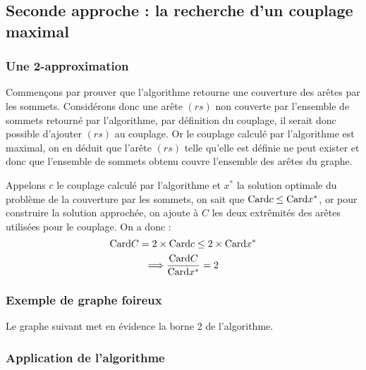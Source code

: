 \subsection{Seconde approche : la recherche d'un couplage maximal}

\subsubsection{Une 2-approximation}

Commençons par prouver que l'algorithme retourne une couverture des arêtes par les sommets.
Considérons donc une arête $(rs)$ non couverte par l'ensemble de sommets retourné par l'algorithme, par
définition du couplage, il serait donc possible d'ajouter $(rs)$ au couplage. Or le couplage calculé
par l'algorithme est maximal, on en déduit que l'arête $(rs)$ telle qu'elle est définie ne peut
exister et donc que l'ensemble de sommets obtenu couvre l'ensemble des arêtes du graphe.

Appelons $c$ le couplage calculé par l'algorithme et $x^*$ la solution optimale du problème de la
couverture par les sommets, on sait que $\mathrm{Card} c \leq \mathrm{Card} x^*$, or pour construire la solution
approchée, on ajoute à $C$ les deux extrêmités des arêtes utilisées pour le couplage. On a donc :$$
\mathrm{Card} C = 2 \times \mathrm{Card} c \leq 2 \times \mathrm{Card} x^*$$ $$\Longrightarrow \frac{\mathrm{Card} C}{\mathrm{Card} x^*} =
2$$

\subsubsection{Exemple de graphe foireux}

Le graphe suivant met en évidence la borne 2 de l'algorithme.


\subsubsection{Application de l'algorithme}
